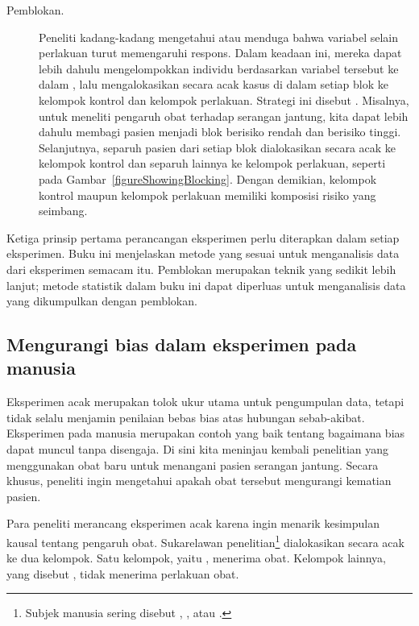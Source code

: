 \begin{description}
\item[Pemblokan.] Peneliti kadang-kadang mengetahui atau menduga bahwa variabel
    selain perlakuan turut memengaruhi respons. Dalam keadaan ini, mereka dapat
    lebih dahulu mengelompokkan individu berdasarkan variabel tersebut ke dalam
    , lalu mengalokasikan secara acak kasus di dalam setiap blok ke
    kelompok kontrol dan kelompok perlakuan. Strategi ini disebut . Misalnya, untuk
    meneliti pengaruh obat terhadap serangan jantung, kita dapat lebih dahulu
    membagi pasien menjadi blok berisiko rendah dan berisiko tinggi. Selanjutnya,
    separuh pasien dari setiap blok dialokasikan secara acak ke kelompok kontrol
    dan separuh lainnya ke kelompok perlakuan, seperti pada
    Gambar~\ref{figureShowingBlocking}. Dengan demikian, kelompok kontrol maupun
    kelompok perlakuan memiliki komposisi risiko yang seimbang.
\end{description}

Ketiga prinsip pertama perancangan eksperimen perlu diterapkan dalam setiap
eksperimen. Buku ini menjelaskan metode yang sesuai untuk menganalisis data dari
eksperimen semacam itu. Pemblokan merupakan teknik yang sedikit lebih lanjut;
metode statistik dalam buku ini dapat diperluas untuk menganalisis data yang
dikumpulkan dengan pemblokan.

\subsection{Mengurangi bias dalam eksperimen pada manusia}
\label{biasInHumanExperiments}

Eksperimen acak merupakan tolok ukur utama untuk pengumpulan data, tetapi tidak
selalu menjamin penilaian bebas bias atas hubungan sebab-akibat. Eksperimen pada
manusia merupakan contoh yang baik tentang bagaimana bias dapat muncul tanpa
disengaja. Di sini kita meninjau kembali penelitian yang menggunakan obat baru
untuk menangani pasien serangan jantung. Secara khusus, peneliti ingin mengetahui
apakah obat tersebut mengurangi kematian pasien.

Para peneliti merancang eksperimen acak karena ingin menarik kesimpulan kausal
tentang pengaruh obat. Sukarelawan penelitian\footnote{Subjek manusia sering
disebut , , atau .}
dialokasikan secara acak ke dua kelompok. Satu kelompok, yaitu , menerima obat. Kelompok lainnya, yang disebut ,
tidak menerima perlakuan obat.

